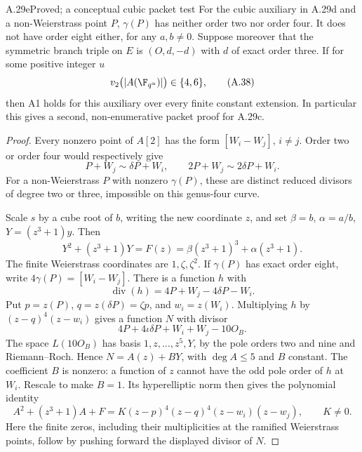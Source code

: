 \begin{claim}{A.29e}{Proved; a conceptual cubic packet test}
For the cubic auxiliary in A.29d and a non-Weierstrass
point $P$, $\gamma(P)$ has neither order two nor order four.
It does not have order eight either, for any $a,b\ne0$.
Suppose moreover that the symmetric branch triple
on $E$ is $(O,d,-d)$ with $d$ of exact order three.
If for some positive integer $u$
\[
 v_2\bigl(|A(\F_{q^u})|\bigr)\in\{4,6\},              \tag{A.38}
\]
then A1 holds for this auxiliary over every finite
constant extension. In particular this gives a
second, non-enumerative packet proof for A.29c.
\end{claim}
\begin{proof}
Every nonzero point of $A[2]$ has the form
$[W_i-W_j]$, $i\ne j$. Order two or order four
would respectively give
\[
 P+W_j\sim\delta P+W_i,
 \qquad 2P+W_j\sim2\delta P+W_i.
\]
For a non-Weierstrass $P$ with nonzero $\gamma(P)$,
these are distinct reduced divisors of degree two
or three, impossible on this genus-four curve.

Scale $s$ by a cube root of $b$, writing the new
coordinate $z$, and set
$\beta=b$, $\alpha=a/b$, $Y=(z^3+1)y$. Then
\[
 Y^2+(z^3+1)Y
      =F(z)=\beta(z^3+1)^3+\alpha(z^3+1).              \tag{A.39}
\]
The finite Weierstrass coordinates are $1,\zeta,\zeta^2$.
If $\gamma(P)$ has exact order eight, write
$4\gamma(P)=[W_i-W_j]$. There is a function $h$ with
\[
 \operatorname{div}(h)=4P+W_j-4\delta P-W_i.
\]
Put $p=z(P)$, $q=z(\delta P)=\zeta p$, and
$w_i=z(W_i)$. Multiplying $h$ by
$(z-q)^4(z-w_i)$ gives a function $N$ with divisor
\[
 4P+4\iota\delta P+W_i+W_j-10O_B.
\]
The space $L(10O_B)$ has basis $1,z,\ldots,z^5,Y$,
by the pole orders two and nine and Riemann--Roch.
Hence $N=A(z)+B Y$, with $\deg A\le5$ and $B$
constant. The coefficient $B$ is nonzero: a function
of $z$ cannot have the odd pole order of $h$ at
$W_i$. Rescale to make $B=1$. Its hyperelliptic norm
then gives the polynomial identity
\[
 A^2+(z^3+1)A+F
   =K(z-p)^4(z-q)^4(z-w_i)(z-w_j),\qquad K\ne0.        \tag{A.40}
\]
Here the finite zeros, including their multiplicities
at the ramified Weierstrass points, follow by pushing
forward the displayed divisor of $N$.


\end{proof}
